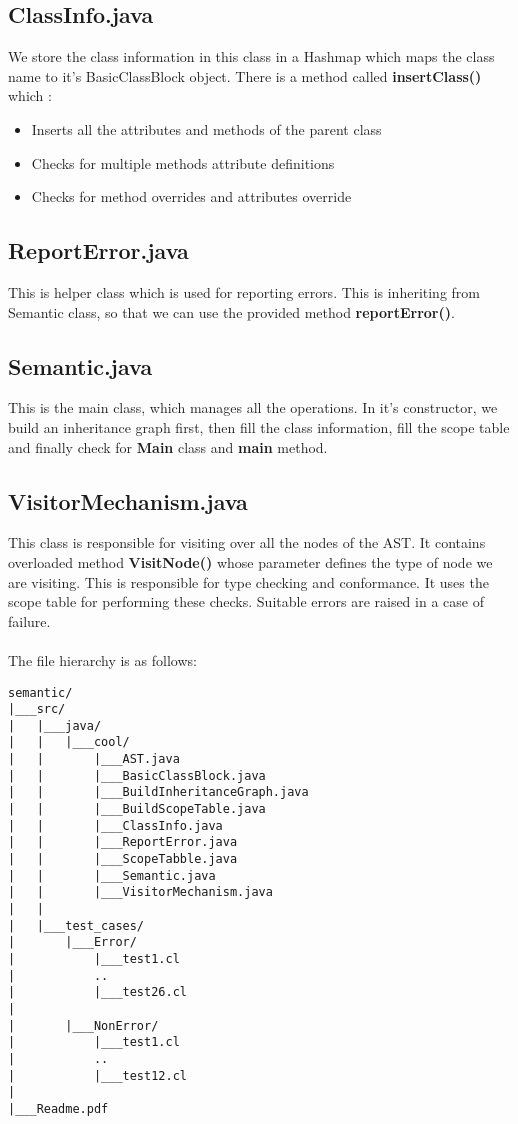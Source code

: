 \documentclass{article}
\begin{document}
\subsection{ClassInfo.java}
We store the class information in this class in a Hashmap which maps the class name to it's BasicClassBlock object. There is a method called \textbf{insertClass()} which :
\begin{itemize}
    \item Inserts all the attributes and methods of the parent class
    \item Checks for multiple methods attribute definitions
    \item Checks for method overrides and attributes override 
\end{itemize}

\subsection{ReportError.java}
This is helper class which is used for reporting errors. This is inheriting from Semantic class, so that we can use the provided method \textbf{reportError()}.

\subsection{Semantic.java}
This is the main class, which manages all the operations. In it's constructor, we build an inheritance graph first, then fill the class information, fill the scope table and finally check for \textbf{Main} class and \textbf{main} method. 

\subsection{VisitorMechanism.java}
This class is responsible for visiting over all the nodes of the AST. It contains overloaded method \textbf{VisitNode()} whose parameter defines the type of node we are visiting. This is responsible for type checking and conformance. It uses the scope table for performing these checks. Suitable errors are raised in a case of failure.
\\ \\
The file hierarchy is as follows:
\begin{lstlisting}
semantic/
|___src/
|   |___java/
|   |   |___cool/
|   |       |___AST.java
|   |       |___BasicClassBlock.java
|   |       |___BuildInheritanceGraph.java
|   |       |___BuildScopeTable.java
|   |       |___ClassInfo.java
|   |       |___ReportError.java
|   |       |___ScopeTabble.java
|   |       |___Semantic.java
|   |       |___VisitorMechanism.java
|   |
|   |___test_cases/
|       |___Error/
|           |___test1.cl
|           ..
|           |___test26.cl
|
|       |___NonError/
|           |___test1.cl
|           ..
|           |___test12.cl
|
|___Readme.pdf
\end{lstlisting}
\end{document}
